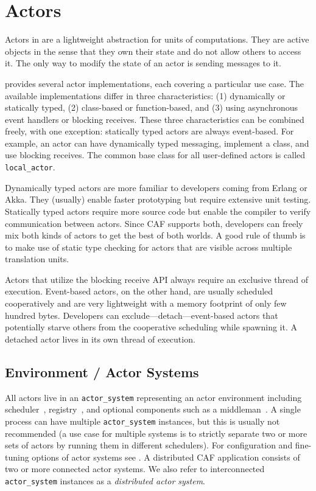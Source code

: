 \section{Actors}
\label{actor}

Actors in \lib are a lightweight abstraction for units of computations. They are active objects in the sense that they own their state and do not allow others to access it. The only way to modify the state of an actor is sending messages to it.

\lib provides several actor implementations, each covering a particular use case.
The available implementations differ in three characteristics: (1) dynamically or statically typed, (2) class-based or function-based, and (3) using asynchronous event handlers or blocking receives.
These three characteristics can be combined freely, with one exception: statically typed actors are always event-based.
For example, an actor can have dynamically typed messaging, implement a class, and use blocking receives.
The common base class for all user-defined actors is called \lstinline^local_actor^.

Dynamically typed actors are more familiar to developers coming from Erlang or Akka.
They (usually) enable faster prototyping but require extensive unit testing.
Statically typed actors require more source code but enable the compiler to verify communication between actors.
Since CAF supports both, developers can freely mix both kinds of actors to get the best of both worlds.
A good rule of thumb is to make use of static type checking for actors that are visible across multiple translation units.

Actors that utilize the blocking receive API always require an exclusive thread of execution. Event-based actors, on the other hand, are usually scheduled cooperatively and are very lightweight with a memory footprint of only few hundred bytes. Developers can exclude---detach---event-based actors that potentially starve others from the cooperative scheduling while spawning it. A detached actor lives in its own thread of execution.

\subsection{Environment / Actor Systems}
\label{actor-system}

All actors live in an \lstinline^actor_system^ representing an actor environment including scheduler~, registry~, and optional components such as a middleman~. A single process can have multiple \lstinline^actor_system^ instances, but this is usually not recommended (a use case for multiple systems is to strictly separate two or more sets of actors by running them in different schedulers). For configuration and fine-tuning options of actor systems see . A distributed CAF application consists of two or more connected actor systems. We also refer to interconnected \lstinline^actor_system^ instances as a \emph{distributed actor system}.


